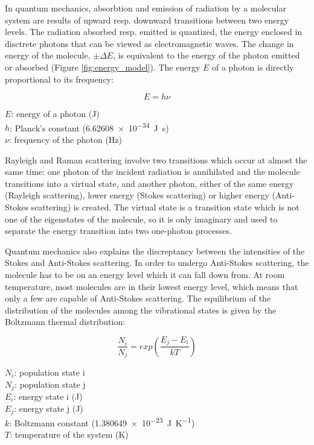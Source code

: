 In quantum mechanics, absorbtion and emission of radiation by a molecular system are results of upward resp. downward transitions between two energy levels. The radiation absorbed resp. emitted is quantized, the energy enclosed in disctrete photons that can be viewed as electromagnetic waves. The change in energy of the molecule, \(\pm\Delta E\), is equivalent to the energy of the photon emitted or absorbed (Figure \ref{fig:energy_model}). The energy \(E\) of a photon is directly proportional to its frequency:

\begin{equation}
    E = h \nu
\end{equation}

\( E\): energy of a photon (\unit{\joule})\\
\( h\): Planck's constant (\SI{6.62608e-34}{\joule\second})\\
\(\nu\): frequency of the photon (\unit{\hertz})

\bigskip

Rayleigh and Raman scattering involve two transitions which occur at almost the same time: one photon of the incident radiation is annihilated and the molecule transitions into a virtual state, and another photon, either of the same energy (Rayleigh scattering), lower energy (Stokes scattering) or higher energy (Anti-Stokes scattering) is created. The virtual state is a transition state which is not one of the eigenstates of the molecule, so it is only imaginary and used to separate the energy transition into two one-photon processes. 

\bigskip

Quantum mechanics also explains the discreptancy between the intensities of the Stokes and Anti-Stokes scattering. In order to undergo Anti-Stokes scattering, the molecule has to be on an energy level which it can fall down from. At room temperature, most molecules are in their lowest energy level, which means that only a few are capable of Anti-Stokes scattering. The equilibrium of the distribution of the molecules among the vibrational states is given by the Boltzmann thermal distribution:

 \begin{equation}
    \frac{N_i}{N_j} = exp \left( \frac{E_j-E_i}{kT}\right)
 \end{equation}

\(N_i\): population state i \\
\(N_j\): population state j \\
\(E_i\): energy state i (\unit{\joule})\\
\(E_j\): energy state j (\unit{\joule})\\
\(k\): Boltzmann constant (\SI{1.380649e-23}{\joule\per\kelvin})\\
\(T\): temperature of the system (\unit{\kelvin})

